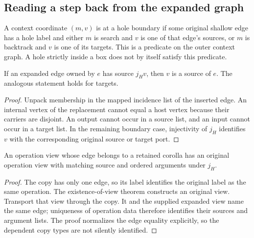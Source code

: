 \subsection{Reading a step back from the expanded graph}
\begin{definition}\label{term:hole-boundary}
A context coordinate $(m,v)$ is at a hole boundary if some original shallow
edge has a hole label and either $m$ is search and $v$ is one of that edge's
sources, or $m$ is backtrack and $v$ is one of its targets. This is a predicate
on the outer context graph. A hole strictly inside a box does not by itself
satisfy this predicate.
\end{definition}
\begin{lemma}
If an expanded edge owned by $e$ has source $j_Hv$, then $v$ is a source of $e$.
The analogous statement holds for targets.
\end{lemma}
\begin{proof}
Unpack membership in the mapped incidence list of the inserted edge. An internal
vertex of the replacement cannot equal a host vertex because their carriers
are disjoint. An output cannot occur in a source list, and an input cannot
occur in a target list. In the remaining boundary case, injectivity of $j_H$
identifies $v$ with the corresponding original source or target port.
\end{proof}
\begin{lemma}
An operation view whose edge belongs to a retained corolla has an original
operation view with matching source and ordered arguments under $j_H$.
\end{lemma}
\begin{proof}
The copy has only one edge, so its label identifies the original label as the
same operation. The existence-of-view theorem constructs an original view.
Transport that view through the copy. It and the supplied expanded view name
the same edge; uniqueness of operation data therefore identifies their sources
and argument lists. The proof normalizes the edge equality explicitly, so the
dependent copy types are not silently identified.
\end{proof}
